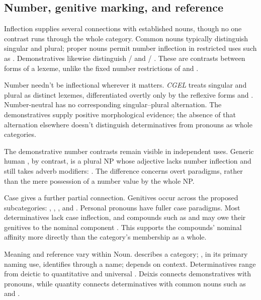 \documentclass[12pt]{article}
\begin{document}
\subsection{Number, genitive marking, and reference}\label{sec:inflection}

Inflection supplies several connections with established nouns, though no one contrast runs through the whole category. Common nouns typically distinguish singular and plural; proper nouns permit number inflection in restricted uses such as . Demonstratives likewise distinguish / and / \citep[373, 521]{huddleston2002}. These are contrasts between forms of a lexeme, unlike the fixed number restrictions of  and .

Number needn't be inflectional wherever it matters. \textit{CGEL} treats singular and plural  as distinct lexemes, differentiated overtly only by the reflexive forms  and  \citep[486]{huddleston2002}. Number-neutral  has no corresponding singular--plural alternation. The demonstratives supply positive morphological evidence; the absence of that alternation elsewhere doesn't distinguish determinatives from pronouns as whole categories.

The demonstrative number contrasts remain visible in independent uses. Generic human , by contrast, is a plural NP whose adjective lacks number inflection and still takes adverb modifiers:  \citep[418]{huddleston2002}. The difference concerns overt paradigms, rather than the mere possession of a number value by the whole NP.

Case gives a further partial connection. Genitives occur across the proposed subcategories: , , , and . Personal pronouns have fuller case paradigms. Most determinatives lack case inflection, and compounds such as  and  may owe their genitives to the nominal component \citep[423--424, 479--480]{huddleston2002}. This supports the compounds' nominal affinity more directly than the category's membership as a whole.

Meaning and reference vary within Noun.  describes a category; , in its primary naming use, identifies through a name;  depends on context. Determinatives range from deictic  to quantitative  and universal  \citep[358--360, 370--405, 425--428, 515--521]{huddleston2002}. Deixis connects demonstratives with pronouns, while quantity connects determinatives with common nouns such as  and .
\end{document}
